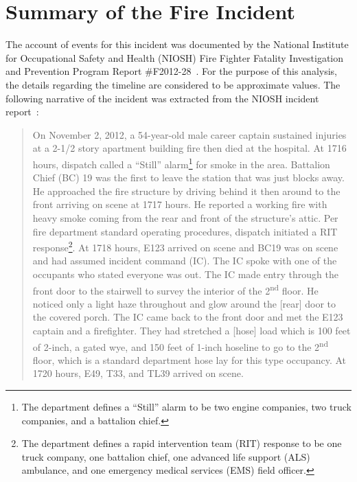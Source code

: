 \section{Summary of the Fire Incident}
\label{fire_sum}
The account of events for this incident was documented by the National Institute for Occupational Safety and Health (NIOSH) Fire Fighter Fatality Investigation and Prevention Program Report \#F2012-28~\cite{NIOSH:Bowyer}. For the purpose of this analysis, the details regarding the timeline are considered to be approximate values. The following narrative of the incident was extracted from the NIOSH incident report~\cite{NIOSH:Bowyer}:
\begin{quote}
On November 2, 2012, a 54-year-old male career captain sustained injuries at a 2-1/2 story apartment building fire then died at the hospital. At 1716 hours, dispatch called a ``Still'' alarm\footnote{The department defines a ``Still'' alarm to be two engine companies, two truck companies, and a battalion chief.} for smoke in the area. Battalion Chief (BC) 19 was the first to leave the station that was just blocks away. He approached the fire structure by driving behind it then around to the front arriving on scene at 1717 hours. He reported a working fire with heavy smoke coming from the rear and front of the structure's attic. Per fire department standard operating procedures, dispatch initiated a RIT response\footnote{The department defines a rapid intervention team (RIT) response to be one truck company, one battalion chief, one advanced life support (ALS) ambulance, and one emergency medical services (EMS) field officer.}. At 1718 hours, E123 arrived on scene and BC19 was on scene and had assumed incident command (IC). The IC spoke with one of the occupants who stated everyone was out. The IC made entry through the front door to the stairwell to survey the interior of the 2\textsuperscript{nd} floor. He noticed only a light haze throughout and glow around the [rear] door to the covered porch. The IC came back to the front door and met the E123 captain and a firefighter. They had stretched a [hose] load which is 100 feet of 2-inch, a gated wye, and 150 feet of 1-inch hoseline to go to the 2\textsuperscript{nd} floor, which is a standard department hose lay for this type occupancy. At 1720 hours, E49, T33, and TL39 arrived on scene.


\end{quote}
